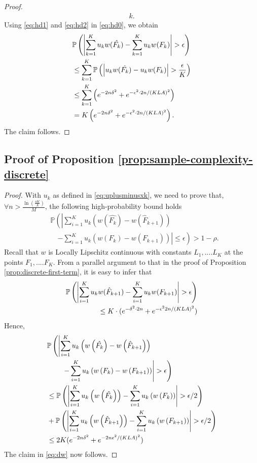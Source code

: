 \begin{proof}
\begin{align}
    k.\label{eq:hd2}
\end{align}
Using \eqref{eq:hd1} and \eqref{eq:hd2} in \eqref{eq:hd0}, we obtain
\begin{align*}
& \mathbb{P}\left( \left| \sum_{k=1}^K u_k w(\hat{F_k}) - \sum_{k=1}^K u_k w(F_k) \right| >\epsilon \right)\\
 & \leq
\sum_{k=1}^K \mathbb{P}\left( \left| u_k w(\hat{F_k}) -u_k w(F_k) \right| > \frac {\epsilon} {K} \right) \\ 
& \le \sum_{k=1}^K \left( e^{-2n\delta^2} + e^{-\epsilon^2 \cdot 2n/ (KLA)^2} \right) \\ 
& =K    \left(e^{-2n\delta^2} + e^{-\epsilon^2 \cdot 2n/ (KLA)^2}\right).
\end{align*}
The claim follows.
\end{proof}

\subsection*{Proof of Proposition \ref{prop:sample-complexity-discrete}}
\begin{proof}
With $u_k$ as defined in \eqref{eq:uplusminusxk}, we need to prove that, $\forall n > \frac{\ln(\frac{4K}{A})} { M}$, the following high-probability bound holds
\begin{align}
&\mathbb{P}\left(\left|\sum_{i=1}^K u_{k} \left(w\left(\hat{F_k}\right)- w\left(\hat F_{k+1}\right) \right)\right.\right.\nonumber\\
&\quad\left.\left.-  
\sum_{i=1}^K u_{k} \left(w\left(F_k\right)- w\left(F_{k+1}\right) \right)
\right| \leq \epsilon\right) > 1-\rho.
\label{eq:dw}
\end{align}
Recall that $w$ is Locally Lipschitz continuous with constants $L_1,....L_K$ at the points $F_1,....F_K$.
From a parallel argument to that in the proof of Proposition \ref{prop:discrete-first-term}, it is easy to infer that
\begin{align*}
\mathbb{P}\left( \left| \sum_{i=1}^K u_k w(\hat F_{k+1}) - \sum_{i=1}^K u_k w(F_{k+1}) \right| >\epsilon \right)\\
\le
K\cdot ( e^{-\delta^2\cdot 2n} + e^{-\epsilon^2 2n/(KLA)^2})
\end{align*}
Hence,
\begin{align*}
& \mathbb{P}\left(\left|\sum_{i=1}^K u_k \left(w\left(\hat{F_k}\right)- w\left(\hat F_{k+1}\right) \right)\right.\right.\\
&\qquad\left.\left. -  \sum_{i=1}^K u_k \left(w\left(F_k\right)-
w\left(F_{k+1}\right) \right) \right| > \epsilon\right) \\ 
&\leq  \mathbb{P}\left( \left|\sum_{i=1}^K u_k \left(w\left(\hat{F_k}\right)\right) -
    \sum_{i=1}^K u_k \left(w\left(F_k\right)\right) \right| > \epsilon/2 \right) \\
		&+ \mathbb{P}\left( \left|\sum_{i=1}^K u_k
    \left(w\left(\hat F_{k+1}\right)\right) -  \sum_{i=1}^K u_k \left(w\left(F_{k+1}\right)\right) \right| > \epsilon/2 \right) \\ 
		&\leq  2K
    (e^{-2n\delta^2} + e^{-2n\epsilon^2/(KLA)^2})
\end{align*}
The claim in \eqref{eq:dw} now follows.
\end{proof}
